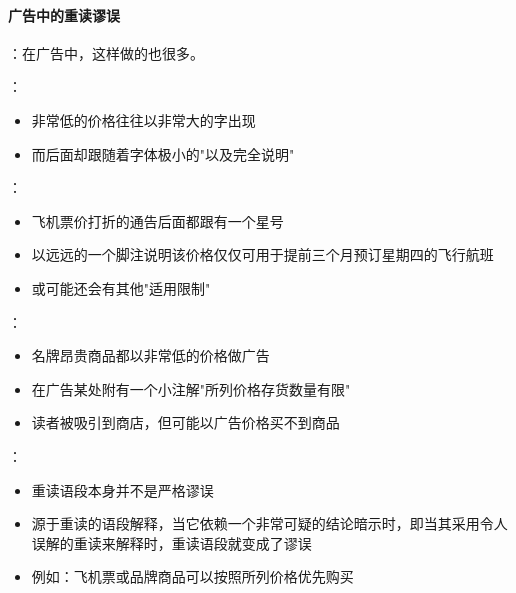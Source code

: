 \paragraph{广告中的重读谬误}
\begin{examplebox}[title=广告中的重读谬误]
：在广告中，这样做的也很多。

：
\begin{itemize}
  \item 非常低的价格往往以非常大的字出现
  \item 而后面却跟随着字体极小的"以及完全说明"
\end{itemize}

：
\begin{itemize}
  \item 飞机票价打折的通告后面都跟有一个星号
  \item 以远远的一个脚注说明该价格仅仅可用于提前三个月预订星期四的飞行航班
  \item 或可能还会有其他"适用限制"
\end{itemize}

：
\begin{itemize}
  \item 名牌昂贵商品都以非常低的价格做广告
  \item 在广告某处附有一个小注解"所列价格存货数量有限"
  \item 读者被吸引到商店，但可能以广告价格买不到商品
\end{itemize}

：
\begin{itemize}
  \item 重读语段本身并不是严格谬误
  \item 源于重读的语段解释，当它依赖一个非常可疑的结论暗示时，即当其采用令人误解的重读来解释时，重读语段就变成了谬误
  \item 例如：飞机票或品牌商品可以按照所列价格优先购买
\end{itemize}
\end{examplebox}

